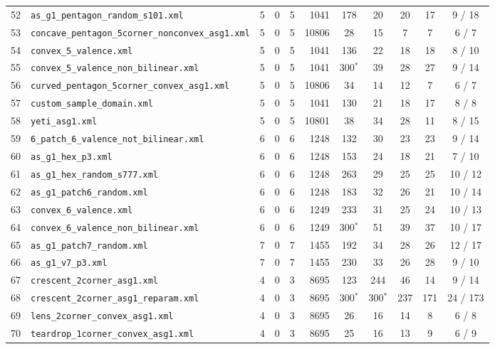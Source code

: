 \documentclass[10pt,a4paper]{article}
\begin{document}
{\begin{longtable}{@{}rlrrrrccccc@{}}
52 & \texttt{as\_g1\_pentagon\_random\_s101.xml} & 5 & 0 & 5 & 1041 & 178 & 20 & 20 & 17 & 9 / 18 \\
53 & \texttt{concave\_pentagon\_5corner\_nonconvex\_asg1.xml} & 5 & 0 & 5 & 10806 & 28 & 15 & 7 & 7 & 6 / 7 \\
54 & \texttt{convex\_5\_valence.xml} & 5 & 0 & 5 & 1041 & 136 & 22 & 18 & 18 & 8 / 10 \\
55 & \texttt{convex\_5\_valence\_non\_bilinear.xml} & 5 & 0 & 5 & 1041 & 300$^*$ & 39 & 28 & 27 & 9 / 14 \\
56 & \texttt{curved\_pentagon\_5corner\_convex\_asg1.xml} & 5 & 0 & 5 & 10806 & 34 & 14 & 12 & 7 & 6 / 7 \\
57 & \texttt{custom\_sample\_domain.xml} & 5 & 0 & 5 & 1041 & 130 & 21 & 18 & 17 & 8 / 8 \\
58 & \texttt{yeti\_asg1.xml} & 5 & 0 & 5 & 10801 & 38 & 34 & 28 & 11 & 8 / 15 \\
59 & \texttt{6\_patch\_6\_valence\_not\_bilinear.xml} & 6 & 0 & 6 & 1248 & 132 & 30 & 23 & 23 & 9 / 14 \\
60 & \texttt{as\_g1\_hex\_p3.xml} & 6 & 0 & 6 & 1248 & 153 & 24 & 18 & 21 & 7 / 10 \\
61 & \texttt{as\_g1\_hex\_random\_s777.xml} & 6 & 0 & 6 & 1248 & 263 & 29 & 25 & 25 & 10 / 12 \\
62 & \texttt{as\_g1\_patch6\_random.xml} & 6 & 0 & 6 & 1248 & 183 & 32 & 26 & 21 & 10 / 14 \\
63 & \texttt{convex\_6\_valence.xml} & 6 & 0 & 6 & 1249 & 233 & 31 & 25 & 24 & 10 / 13 \\
64 & \texttt{convex\_6\_valence\_non\_bilinear.xml} & 6 & 0 & 6 & 1249 & 300$^*$ & 51 & 39 & 37 & 10 / 17 \\
65 & \texttt{as\_g1\_patch7\_random.xml} & 7 & 0 & 7 & 1455 & 192 & 34 & 28 & 26 & 12 / 17 \\
66 & \texttt{as\_g1\_v7\_p3.xml} & 7 & 0 & 7 & 1455 & 230 & 33 & 26 & 28 & 9 / 10 \\
67 & \texttt{crescent\_2corner\_asg1.xml} & 4 & 0 & 3 & 8695 & 123 & 244 & 46 & 14 & 9 / 14 \\
68 & \texttt{crescent\_2corner\_asg1\_reparam.xml} & 4 & 0 & 3 & 8695 & 300$^*$ & 300$^*$ & 237 & 171 & 24 / 173 \\
69 & \texttt{lens\_2corner\_convex\_asg1.xml} & 4 & 0 & 3 & 8695 & 26 & 16 & 14 & 8 & 6 / 8 \\
70 & \texttt{teardrop\_1corner\_convex\_asg1.xml} & 4 & 0 & 3 & 8695 & 25 & 16 & 13 & 9 & 6 / 9 \\

\end{longtable}}
\end{document}
